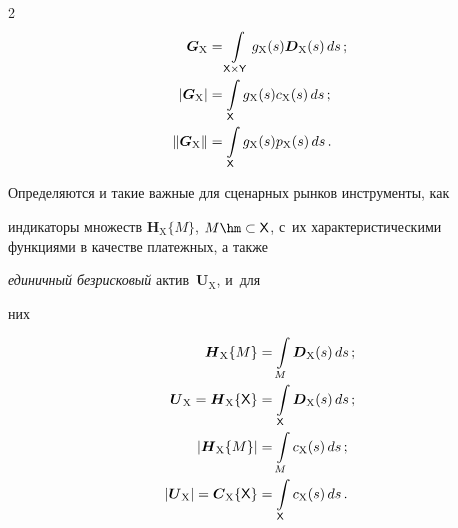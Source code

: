 \begin{multicols}{2}
  \begin{align*}


  \boldsymbol{G}_{\mathrm{X}} &= \int\limits_{{\sf X}\times{\sf Y}} 


g_{\mathrm{X}}(s) \boldsymbol{D}_{\mathrm{X}}(s)\,ds\,; \\


  \left\vert \boldsymbol{G}_{\mathrm{X}}\right\vert &=\int\limits_{\sf X} 


g_{\mathrm{X}}(s)c_{\mathrm{X}}(s)\,ds\,;\\


  \left\| \boldsymbol{G}_{\mathrm{X}}\right\| &=\int\limits_{\sf X} 


g_{\mathrm{X}}(s) p_{\mathrm{X}}(s)\,ds\,.


  \end{align*}


  


  Определяются и такие важные для сценарных рынков инструменты, как 


индикаторы множеств $\boldsymbol{H}_{\mathrm{X}}\{M\}$, $M \hm\subset 


{\sf X}$, с~их характеристическими функциями в качестве платежных, а также 


\textit{единичный безрисковый} актив~$\boldsymbol{U}_{\mathrm{X}}$, и~для 


них


  \begin{align*}


  \boldsymbol{H}_{\mathrm{X}}\{M\} &= \int\limits_M 


\boldsymbol{D}_{\mathrm{X}}(s)\,ds\,;\\  


\boldsymbol{U}_{\mathrm{X}} = 


\boldsymbol{H}_{\mathrm{X}}\{{\sf X}\}& =\int\limits_{\sf X} 


\boldsymbol{D}_{\mathrm{X}}(s)\,ds\,;\\


  \left\vert \boldsymbol{H}_{\mathrm{X}}\{M\}\right\vert &= \int\limits_M 


c_{\mathrm{X}}(s)\,ds\,;\\


  \left\vert 


\boldsymbol{U}_{\mathrm{X}}\right\vert


   = \boldsymbol{C}_{\mathrm{X}}\{{\sf X}\} &=\int\limits_{\sf X} 


c_{\mathrm{X}}(s)\,ds\,.



\end{align*}
\end{multicols}
